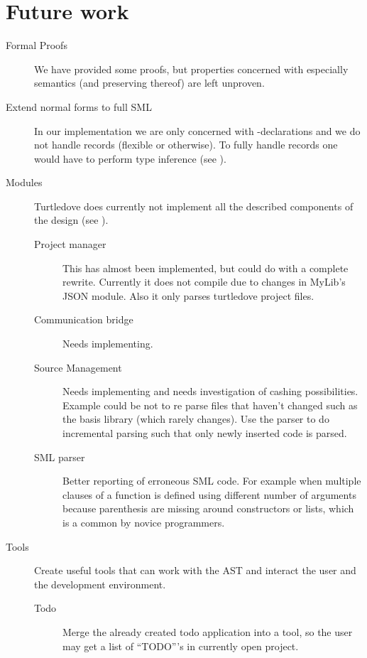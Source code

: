 \section{Future work}
\label{sec:future-work}

\begin{description}
\item[Formal Proofs] We have provided some proofs, but properties concerned with
  especially semantics (and preserving thereof) are left unproven.

\item[Extend normal forms to full SML] In our implementation we are only concerned
  with -declarations and we do not handle records (flexible or
  otherwise). To fully handle records one would have to perform type inference
  (see ).

\item[Modules] Turtledove does currently not implement all the described
  components of the design (see ). 
  \begin{description}
  \item[Project manager] This has almost been implemented, but could do with a
    complete rewrite. Currently it does not compile due to changes in MyLib's
    JSON module. Also it only parses turtledove project files.

  \item[Communication bridge] Needs implementing.

  \item[Source Management] Needs implementing and needs investigation of cashing
    possibilities. Example could be not to re parse files that haven't changed
    such as the basis library (which rarely changes). Use the parser to do
    incremental parsing such that only newly inserted code is parsed.

  \item[SML parser] Better reporting of erroneous SML code. For example when
    multiple clauses of a function is defined using different number of
    arguments because parenthesis are missing around constructors or lists,
    which is a common by novice programmers.
  \end{description}

\item[Tools] Create useful tools that can work with the AST and interact the
  user and the development environment.

  \begin{description}
  \item[Todo] Merge the already created todo application into a tool, so the
    user may get a list of ``TODO'''s in currently open project.


\end{description}
\end{description}

